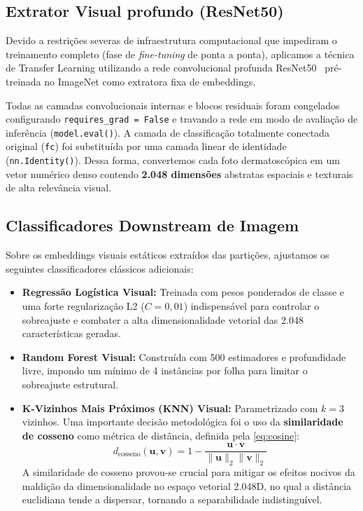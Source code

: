 \documentclass[10pt,twocolumn,letterpaper]{article}
\begin{document}
\subsection{Extrator Visual profundo (ResNet50)}
Devido a restrições severas de infraestrutura computacional que impediram o treinamento completo (fase de \emph{fine-tuning} de ponta a ponta), aplicamos a técnica de Transfer Learning utilizando a rede convolucional profunda ResNet50~\cite{he2016deep} pré-treinada no ImageNet como extratora fixa de embeddings. 

Todas as camadas convolucionais internas e blocos residuais foram congelados configurando \texttt{requires\_grad = False} e travando a rede em modo de avaliação de inferência (\texttt{model.eval()}). A camada de classificação totalmente conectada original (\texttt{fc}) foi substituída por uma camada linear de identidade (\texttt{nn.Identity()}). Dessa forma, convertemos cada foto dermatoscópica em um vetor numérico denso contendo \textbf{2.048 dimensões} abstratas espaciais e texturais de alta relevância visual.

\subsection{Classificadores Downstream de Imagem}
Sobre os embeddings visuais estáticos extraídos das partições, ajustamos os seguintes classificadores clássicos adicionais:
\begin{itemize}
    \item \textbf{Regressão Logística Visual:} Treinada com pesos ponderados de classe e uma forte regularização L2 ($C=0,01$) indispensável para controlar o sobreajuste e combater a alta dimensionalidade vetorial das 2.048 características geradas.
    \item \textbf{Random Forest Visual:} Construída com 500 estimadores e profundidade livre, impondo um mínimo de 4 instâncias por folha para limitar o sobreajuste estrutural.
    \item \textbf{K-Vizinhos Mais Próximos (KNN) Visual:} Parametrizado com $k=3$ vizinhos. Uma importante decisão metodológica foi o uso da \textbf{similaridade de cosseno} como métrica de distância, definida pela \cref{eq:cosine}:
    \begin{equation}
        d_{\text{cosseno}}(\mathbf{u}, \mathbf{v}) = 1 - \frac{\mathbf{u} \cdot \mathbf{v}}{\|\mathbf{u}\|_2 \|\mathbf{v}\|_2}
        \label{eq:cosine}
    \end{equation}
    A similaridade de cosseno provou-se crucial para mitigar os efeitos nocivos da maldição da dimensionalidade no espaço vetorial 2.048D, no qual a distância euclidiana tende a dispersar, tornando a separabilidade indistinguível.
\end{itemize}
\end{document}
